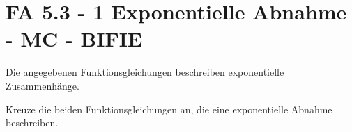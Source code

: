 \section{FA 5.3 - 1 Exponentielle Abnahme - MC - BIFIE}

\begin{beispiel}[FA 5.3]{1} %
Die angegebenen Funktionsgleichungen beschreiben exponentielle Zusammenhänge.

\leer

Kreuze die beiden Funktionsgleichungen an, die eine exponentielle Abnahme beschreiben.


\end{beispiel}